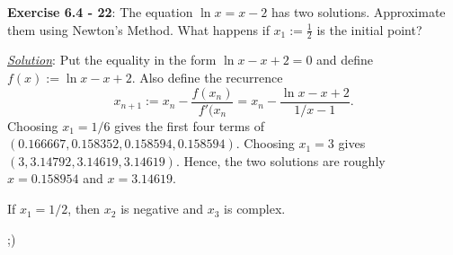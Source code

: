 \documentclass{article}
\begin{document}
\hrulefill

\textbf{Exercise 6.4 - 22}: The equation $\ln x=x-2$ has two solutions.
Approximate them using Newton's Method. What happens if $x_1:=\frac12$ is
the initial point?

\underline{\textit{Solution}}: Put the equality in the form
$\ln x-x+2=0$ and define $f(x):=\ln x-x+2$. Also define the recurrence
\[x_{n+1}:=x_n-\frac{f(x_n)}{f'(x_n}=x_n-\frac{\ln x-x+2}{1/x-1}.\]
Choosing $x_1=1/6$ gives the first four terms of
$(0.166667,0.158352,0.158594,0.158594)$. Choosing $x_1=3$ gives
$(3,3.14792,3.14619,3.14619)$. Hence, the two solutions are roughly
$x=0.158954$ and $x=3.14619$.

If $x_1=1/2$, then $x_2$ is negative and $x_3$ is complex.

\hrulefill

;)
\end{document}
